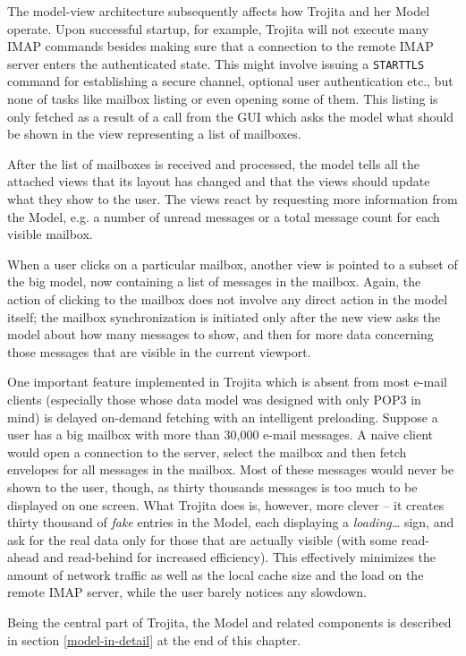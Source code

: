 \documentclass[12pt,notitlepage]{report}
\newcommand{\trojita}{Trojita\xspace}
\begin{document}
The model-view architecture subsequently affects how \trojita and her Model
operate.  Upon successful startup, for example, \trojita will not execute many
IMAP commands besides making sure that a connection to the remote IMAP server
enters the authenticated state.  This might involve issuing a {\tt STARTTLS}
command for establishing a secure channel, optional user authentication etc.,
but none of tasks like mailbox listing or even opening some of them.  This
listing is only fetched as a result of a call from the GUI which asks the model
what should be shown in the view representing a list of mailboxes.

After the list of mailboxes is received and processed, the model tells all the
attached views that its layout has changed and that the views should update what
they show to the user.  The views react by requesting more information from the
Model, e.g. a number of unread messages or a total message count for each
visible mailbox.

When a user clicks on a particular mailbox, another view is pointed to a subset
of the big model, now containing a list of messages in the mailbox.  Again, the
action of clicking to the mailbox does not involve any direct action in the
model itself; the mailbox synchronization is initiated only after the new view
asks the model about how many messages to show, and then for more data
concerning those messages that are visible in the current viewport.

One important feature implemented in \trojita which is absent from most e-mail
clients (especially those whose data model was designed with only POP3 in mind)
is delayed on-demand fetching with an intelligent preloading.  Suppose a user
has a big mailbox with more than 30,000 e-mail messages.  A naive client would
open a connection to the server, select the mailbox and then fetch envelopes for
all messages in the mailbox.  Most of these messages would never be shown to the
user, though, as thirty thousands messages is too much to be displayed on one
screen.  What \trojita does is, however, more clever -- it creates thirty
thousand of {\em fake} entries in the Model, each displaying a {\em
loading\ldots} sign, and ask for the real data only for those that are actually
visible (with some read-ahead and read-behind for increased efficiency).  This
effectively minimizes the amount of network traffic as well as the local cache
size and the load on the remote IMAP server, while the user barely notices any
slowdown.

Being the central part of \trojita, the Model and related components is
described in section \ref{model-in-detail} at the end of this chapter.
\end{document}
